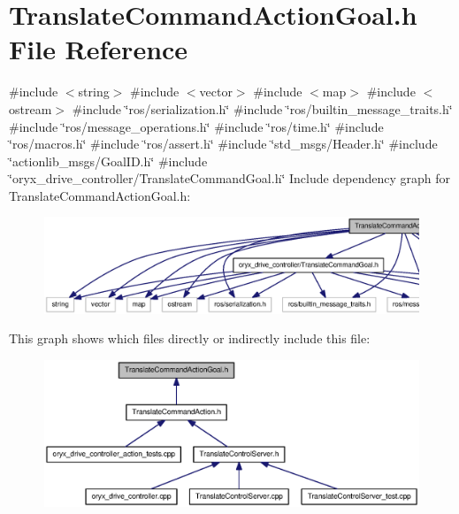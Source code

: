 \section{\-Translate\-Command\-Action\-Goal.\-h \-File \-Reference}
\label{TranslateCommandActionGoal_8h}
{\ttfamily \#include $<$string$>$}\*
{\ttfamily \#include $<$vector$>$}\*
{\ttfamily \#include $<$map$>$}\*
{\ttfamily \#include $<$ostream$>$}\*
{\ttfamily \#include \char`\"{}ros/serialization.\-h\char`\"{}}\*
{\ttfamily \#include \char`\"{}ros/builtin\-\_\-message\-\_\-traits.\-h\char`\"{}}\*
{\ttfamily \#include \char`\"{}ros/message\-\_\-operations.\-h\char`\"{}}\*
{\ttfamily \#include \char`\"{}ros/time.\-h\char`\"{}}\*
{\ttfamily \#include \char`\"{}ros/macros.\-h\char`\"{}}\*
{\ttfamily \#include \char`\"{}ros/assert.\-h\char`\"{}}\*
{\ttfamily \#include \char`\"{}std\-\_\-msgs/\-Header.\-h\char`\"{}}\*
{\ttfamily \#include \char`\"{}actionlib\-\_\-msgs/\-Goal\-I\-D.\-h\char`\"{}}\*
{\ttfamily \#include \char`\"{}oryx\-\_\-drive\-\_\-controller/\-Translate\-Command\-Goal.\-h\char`\"{}}\*
\-Include dependency graph for \-Translate\-Command\-Action\-Goal.\-h\-:
\nopagebreak
\begin{figure}[H]
\begin{center}
\leavevmode
\includegraphics[width=350pt]{TranslateCommandActionGoal_8h__incl}
\end{center}
\end{figure}
\-This graph shows which files directly or indirectly include this file\-:
\nopagebreak
\begin{figure}[H]
\begin{center}
\leavevmode
\includegraphics[width=350pt]{TranslateCommandActionGoal_8h__dep__incl}
\end{center}
\end{figure}
